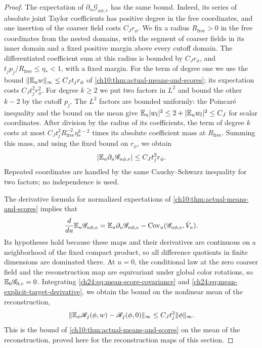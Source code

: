 \begin{proof}
The expectation of $\partial_u\mathscr G_{u\phi,e}$ has the same bound. Indeed, its series of absolute joint Taylor coefficients has positive degree in the free coordinates, and one insertion of the coarser field costs $C_Jr_\phi$. We fix a radius $R_{\mathrm{free}}>0$ in the free coordinates from the nested domains, with the segment of coarser fields in its inner domain and a fixed positive margin above every cutoff domain. The differentiated coefficient sum at this radius is bounded by $C_Jr_\phi$, and $t_jp_j/R_{\mathrm{free}}\le\eta_*<1$, with a fixed margin. For the term of degree one we use the bound $\lVert \mathbb E_uw\rVert_\infty\le C_Jt_jr_\phi$ of \cref{ch10:thm:actual-means-and-scores}; its expectation costs $C_Jt_j^2r_\phi^2$. For degree $k\ge2$ we put two factors in $L^2$ and bound the other $k-2$ by the cutoff $p_j$. The $L^2$ factors are bounded uniformly: the Poincar\'e inequality and the bound on the mean give $\mathbb E_u\lvert w_l\rvert^2\le2+\lvert \mathbb E_uw_l\rvert^2\le C_J$ for scalar coordinates. After division by the radius of its coefficients, the term of degree $k$ costs at most $C_Jt_j^2R_{\mathrm{free}}^{-2}\eta_*^{k-2}$ times its absolute coefficient mass at $R_{\mathrm{free}}$. Summing this mass, and using the fixed bound on $r_\phi$, we obtain
\begin{equation}\label{ch24:eq:mean-explicit-target-derivative}
 \lvert \mathbb E_u\partial_u\mathscr G_{u\phi,e}\rvert\le C_Jt_j^2r_\phi.
\end{equation}
Repeated coordinates are handled by the same Cauchy--Schwarz inequality for two factors; no independence is used.

The derivative formula for normalized expectations of \cref{ch10:thm:actual-means-and-scores} implies that
\[
 \frac{d}{du}\mathbb E_u\mathscr G_{u\phi,e}=\mathbb E_u\partial_u\mathscr G_{u\phi,e}-\operatorname{Cov}_u(\mathscr G_{u\phi,e},\dot V_u).
\]
Its hypotheses hold because these maps and their derivatives are continuous on a neighborhood of the fixed compact product, so all difference quotients in finite dimensions are dominated there. At $u=0$, the conditional law at the zero coarser field and the reconstruction map are equivariant under global color rotations, so $\mathbb E_0\mathscr G_{0,e}=0$. Integrating \eqref{ch24:eq:mean-score-covariance} and \eqref{ch24:eq:mean-explicit-target-derivative}, we obtain the bound on the nonlinear mean of the reconstruction,
\begin{equation}\label{ch24:eq:uniform-reconstructed-mean}
 \lVert \mathbb E_\phi\mathscr R_j(\phi,w)-\mathscr R_j(\phi,0)\rVert_\infty\le C_Jt_j^2\lVert \phi\rVert_\infty.
\end{equation}
This is the bound of \cref{ch10:thm:actual-means-and-scores} on the mean of the reconstruction, proved here for the reconstruction maps of this section.


\end{proof}
